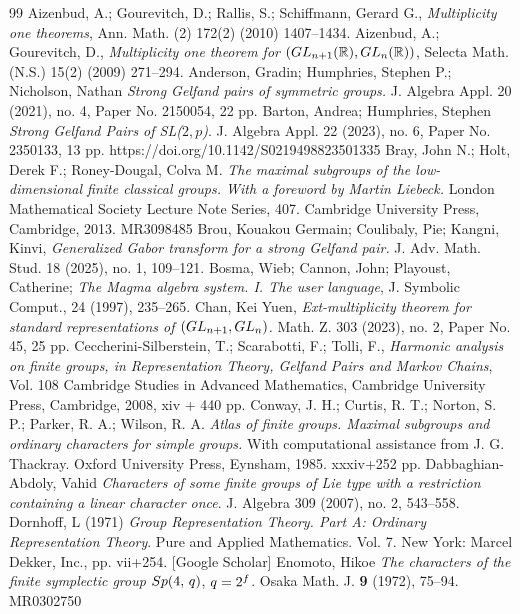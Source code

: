 \documentclass[10pt,a4paper]{amsart}
\theoremstyle{plain}
\theoremstyle{definition}
\numberwithin{equation}{section}
\begin{document}
\begin{thebibliography}{99}
 Aizenbud, A.; Gourevitch, D.; Rallis, S.; Schiffmann, Gerard G., \emph{Multiplicity one theorems}, Ann. Math. (2) 172(2) (2010) 1407--1434.
 Aizenbud, A.; Gourevitch, D., \emph{Multiplicity one theorem for $({\rm GL}_{n+1} (\mathbb R), {\rm GL}_n (\mathbb R))$}, Selecta Math. (N.S.) 15(2) (2009) 271--294.
 Anderson, Gradin; Humphries, Stephen P.; Nicholson, Nathan \emph{Strong Gelfand pairs of symmetric groups.} J. Algebra Appl. 20 (2021), no. 4, Paper No. 2150054, 22 pp.
 Barton, Andrea; Humphries, Stephen \emph{Strong Gelfand Pairs of {\rm SL}($2,p$)}. J. Algebra Appl. 22 (2023), no. 6, Paper No. 2350133, 13 pp. https://doi.org/10.1142/S0219498823501335
 Bray, John N.; Holt, Derek F.; Roney-Dougal, Colva M. \emph{The maximal subgroups of the low-dimensional finite classical groups. With a foreword by Martin Liebeck.} London Mathematical Society Lecture Note Series, 407. Cambridge University Press, Cambridge, 2013. MR3098485
 Brou, Kouakou Germain; Coulibaly, Pie; Kangni, Kinvi, \emph{Generalized Gabor transform for a strong Gelfand pair.} J. Adv. Math. Stud. 18 (2025), no. 1, 109--121.
 Bosma, Wieb; Cannon, John; Playoust, Catherine; \emph{The Magma algebra system. I. The user language}, J. Symbolic Comput., 24 (1997), 235--265.
 Chan, Kei Yuen, \emph{Ext-multiplicity theorem for standard representations of $({\rm GL}_{n+1},{\rm GL}_{n})$.} Math. Z. 303 (2023), no. 2, Paper No. 45, 25 pp.
 Ceccherini-Silberstein, T.; Scarabotti, F.; Tolli, F., \emph{Harmonic analysis on finite groups, in Representation Theory, Gelfand Pairs and Markov Chains}, Vol. 108 Cambridge Studies in Advanced Mathematics, Cambridge University Press, Cambridge, 2008, xiv + 440 pp.
 Conway, J. H.; Curtis, R. T.; Norton, S. P.; Parker, R. A.; Wilson, R. A. \emph{Atlas of finite groups. Maximal subgroups and ordinary characters for simple groups.} With computational assistance from J. G. Thackray. Oxford University Press, Eynsham, 1985. xxxiv+252 pp.
 Dabbaghian-Abdoly, Vahid \emph{Characters of some finite groups of Lie type with a restriction containing a linear character once}. J. Algebra 309 (2007), no. 2, 543--558.
 Dornhoff, L (1971) \emph{Group Representation Theory. Part A: Ordinary Representation Theory}. Pure and Applied Mathematics. Vol. 7. New York: Marcel Dekker, Inc., pp. vii+254. [Google Scholar]
 Enomoto, Hikoe \emph{The characters of the finite symplectic group} ${\rm Sp}(4,\,q)$, $q=2\sp{f}$. Osaka Math. J. \textbf{9} (1972), 75--94. MR0302750

\end{thebibliography}
\end{document}
